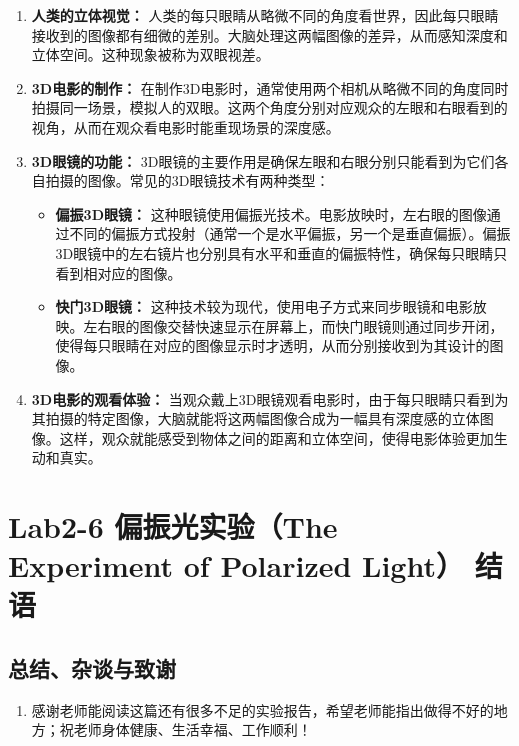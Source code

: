 \documentclass[dvipsnames, svgnames,a4paper,11pt]{article}
\begin{document}
	\begin{enumerate}
		\item \textbf{人类的立体视觉：}
		人类的每只眼睛从略微不同的角度看世界，因此每只眼睛接收到的图像都有细微的差别。大脑处理这两幅图像的差异，从而感知深度和立体空间。这种现象被称为双眼视差。
		
		\item \textbf{3D电影的制作：}
		在制作3D电影时，通常使用两个相机从略微不同的角度同时拍摄同一场景，模拟人的双眼。这两个角度分别对应观众的左眼和右眼看到的视角，从而在观众看电影时能重现场景的深度感。
		
		\item \textbf{3D眼镜的功能：}
		3D眼镜的主要作用是确保左眼和右眼分别只能看到为它们各自拍摄的图像。常见的3D眼镜技术有两种类型：
		\begin{itemize}
			\item \textbf{偏振3D眼镜：} 这种眼镜使用偏振光技术。电影放映时，左右眼的图像通过不同的偏振方式投射（通常一个是水平偏振，另一个是垂直偏振）。偏振3D眼镜中的左右镜片也分别具有水平和垂直的偏振特性，确保每只眼睛只看到相对应的图像。
			
			\item \textbf{快门3D眼镜：} 这种技术较为现代，使用电子方式来同步眼镜和电影放映。左右眼的图像交替快速显示在屏幕上，而快门眼镜则通过同步开闭，使得每只眼睛在对应的图像显示时才透明，从而分别接收到为其设计的图像。
		\end{itemize}
		
		\item \textbf{3D电影的观看体验：}
		当观众戴上3D眼镜观看电影时，由于每只眼睛只看到为其拍摄的特定图像，大脑就能将这两幅图像合成为一幅具有深度感的立体图像。这样，观众就能感受到物体之间的距离和立体空间，使得电影体验更加生动和真实。
	\end{enumerate}	
	
	
	
	\clearpage
	
	\section{Lab2-6 偏振光实验（The Experiment of Polarized Light） \quad\heiti 结语}
	
	\subsection{总结、杂谈与致谢}
	\begin{enumerate}
		\item 感谢老师能阅读这篇还有很多不足的实验报告，希望老师能指出做得不好的地方；祝老师身体健康、生活幸福、工作顺利！
	\end{enumerate}
	
\end{document}
